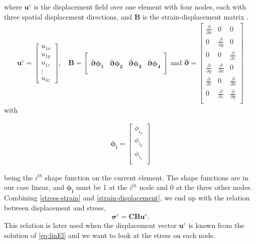 where $\bm{u}^e$ is the displacement field over one element with four nodes, each with three spatial displacement directions, and $\bm{B}$ is the strain-displacement matrix \cite{ch14}.
\begin{align*}
\bm{u}^e = 
\begin{bmatrix}
u_{1x} \\
u_{1y} \\
u_{1z} \\
\vdots \\
u_{4z}
\end{bmatrix}, \,
&\bm{B} = 
\begin{bmatrix} \\
\bar{\bm{\partial}} \bm{\phi_1} & \bar{\bm{\partial}} \bm{\phi_2} & \bar{\bm{\partial}} \bm{\phi_3} & \bar{\bm{\partial}} \bm{\phi_4} \\[1em]
\end{bmatrix} \textrm{ and } 
\bar{\bm{\partial}} = 
\begin{bmatrix}
\frac{\partial}{\partial x} & 0 & 0 \\[0.3em]
0 & \frac{\partial}{\partial y} & 0 \\[0.3em]
0 & 0 & \frac{\partial}{\partial z} \\[0.3em]
\frac{\partial}{\partial y} & \frac{\partial}{\partial x} & 0 \\[0.3em]
\frac{\partial}{\partial z} & 0 & \frac{\partial}{\partial x}\\[0.3em]
0 & \frac{\partial}{\partial z} & \frac{\partial}{\partial y} \\
\end{bmatrix}
\end{align*}
with 

\begin{align*}
\bm{\phi_i} = 
\begin{bmatrix}
\phi_{i_x} \\
\phi_{i_y} \\
\phi_{i_z} \\
\end{bmatrix}
\end{align*}

being the $i^{th}$ shape function on the current element. The shape functions are in our case linear, and $\bm{\phi_i}$ must be 1 at the $i^{th}$ node and 0 at the three other nodes. Combining \eqref{stress-strain} and \eqref{strain-displacement}, we end up with the relation between displacement and stress,
\begin{align}
\label{stress-displacement}
\bm{\sigma}^e = \bm{C} \bm{B} \bm{u}^e.
\end{align}
This relation is later used when the displacement vector $\bm{u}^e$ is known from the solution of \eqref{eq:linEl} and we want to look at the stress on each node. 









